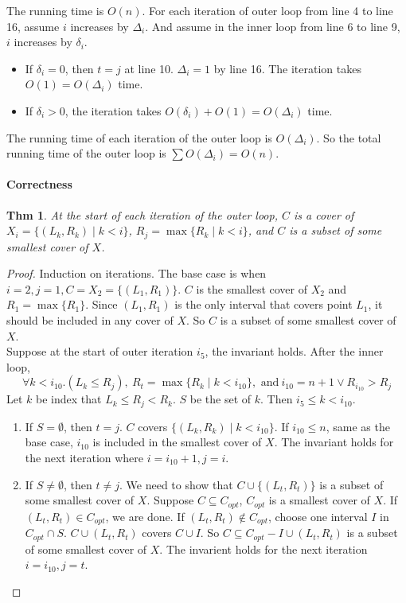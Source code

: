 \documentclass{article}
\newtheorem{thm}{Thm}[section]
\begin{document}
The running time is $O(n)$.
For each iteration of outer loop from line 4 to line 16, assume $i$ increases by $\Delta_i$. And assume in the inner loop from line 6 to line 9, $i$ increases by $\delta_i$.
\begin{itemize}
    \item If $\delta_i=0$, then $t=j$ at line 10. $\Delta_i=1$ by line 16. The iteration takes $O(1)=O(\Delta_i)$ time.
    \item If $\delta_i>0$, the iteration takes $O(\delta_i)+O(1)=O(\Delta_i)$ time.
\end{itemize}
The running time of each iteration of the outer loop is $O(\Delta_i)$. So the total running time of the outer loop is $\sum O(\Delta_i)=O(n)$.
\paragraph{Correctness}
\begin{thm}
    At the start of each iteration of the outer loop, $C$ is a cover of $X_i = \{(L_k, R_k) \mid k < i \}$, $R_j = \max\{R_k \mid k < i\}$, and $C$ is a subset of some smallest cover of $X$.
\end{thm}
\begin{proof}
    Induction on iterations. The base case is when $i=2, j=1, C=X_2=\{(L_1, R_1)\}$. $C$ is the smallest cover of $X_2$ and $R_1=\max\{R_1\}$. Since $(L_1, R_1)$ is the only interval that covers point $L_1$, it should be included in any cover of $X$. So $C$ is a subset of some smallest cover of $X$.\\
    Suppose at the start of outer iteration $i_{5}$, the invariant holds.
    After the inner loop,
    $$\forall k<i_{10}.(L_k\le R_j),\ R_t=\max\{R_k\mid k<i_{10}\},\text{ and}\ i_{10}=n+1\lor R_{i_{10}} > R_j$$
    Let $k$ be index that $L_k \le R_j < R_k$. $S$ be the set of $k$. Then $i_5\le k < i_{10}$.
    \begin{enumerate}
        \item If $S=\emptyset$, then $t=j$. $C$ covers $\{(L_k, R_k)\mid k<i_{10}\}$. If $i_{10}\le n$, same as the base case, $i_{10}$ is included in the smallest cover of $X$. The invariant holds for the next iteration where $i=i_{10}+1, j=i$.
        \item If $S\neq\emptyset$, then $t\neq j$. We need to show that $C\cup \{(L_t, R_t)\}$ is a subset of some smallest cover of $X$. Suppose $C\subseteq C_{opt}$, $C_{opt}$ is a smallest cover of $X$. If $(L_t, R_t)\in C_{opt}$, we are done.
        If $(L_t, R_t)\notin C_{opt}$, choose one interval $I$ in $C_{opt}\cap S$. $C\cup (L_t, R_t)$ covers $C\cup I$. So $C\subseteq C_{opt}-I\cup (L_t, R_t)$ is a subset of some smallest cover of $X$. The invarient holds for the next iteration $i=i_{10}, j=t$.
    \end{enumerate}
\end{proof}
\end{document}
